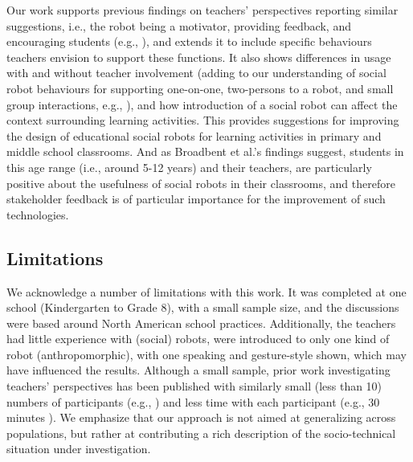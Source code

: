 Our work supports previous findings on teachers' perspectives reporting similar suggestions, i.e., the robot being a motivator, providing feedback, and encouraging students (e.g., \cite{serholt2014teachers,Ahmad2016}), and extends it to include specific behaviours teachers envision to support these functions. It also shows differences in usage with and without teacher involvement (adding to our understanding of social robot behaviours for supporting one-on-one, two-persons to a robot, and small group interactions, e.g., \cite{rosenberg2020}), and how introduction of a social robot can affect the context surrounding learning activities. This provides suggestions for improving the design of educational social robots for learning activities in primary and middle school classrooms. And as Broadbent et al.'s \cite{Broadbent2018} findings suggest, students in this age range (i.e., around 5-12 years) and their teachers, are particularly positive about the usefulness of social robots in their classrooms, and therefore stakeholder feedback is of particular importance for the improvement of such technologies.




\subsection{Limitations}
\label{sec:21}
We acknowledge a number of limitations with this work. It was completed at one school (Kindergarten to Grade 8), with a small sample size, and the discussions were based around North American school practices. Additionally, the teachers had little experience with (social) robots, were introduced to only one kind of robot (anthropomorphic), with one speaking and gesture-style shown, which may have influenced the results. Although a small sample, prior work investigating teachers' perspectives has been published with similarly small (less than 10) numbers of participants (e.g., \cite{serholt2014teachers,Ahmad2016,chang10}) and less time with each participant (e.g., 30 minutes \cite{Ahmad2016}). We emphasize that our approach is not aimed at generalizing across populations, but rather at contributing a rich description of the socio-technical situation under investigation.
 

